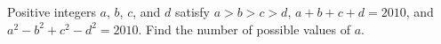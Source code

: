 Positive integers $ a$, $ b$, $ c$, and $ d$ satisfy $ a > b > c > d$, $ a + b + c + d = 2010$, and $ a^2 - b^2 + c^2 - d^2 = 2010$. Find the number of possible values of $ a$.
